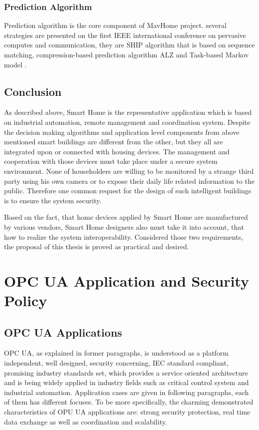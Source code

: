 \subsubsection{Prediction Algorithm}
Prediction algorithm is the core component of MavHome project. several strategies are presented on the first IEEE international conference on pervasive computes and communication, they are SHIP algorithm that is based on sequence matching, compression-based prediction algorithm ALZ and Task-based Markov model \cite{smart_home_agent}.

\subsection{Conclusion}
As described above, Smart Home is the representative application which is based on industrial automation, remote management and coordination system. Despite the decision making algorithms and application level components from above mentioned smart buildings are different from the other, but they all are integrated upon or connected with housing devices. The management and cooperation with those devices must take place under a secure system environment. None of householders are willing to be monitored by a strange third party using his own camera or to expose their daily life related information to the public. Therefore one common request for the design of such intelligent buildings is to ensure the system security.

Based on the fact, that home devices applied by Smart Home are manufactured by various vendors,  Smart Home designers also must take it into account, that how to realize the system interoperability. Considered those two requirements, the proposal of this thesis is proved as practical and desired.

\section{OPC UA Application and Security Policy}

\subsection{OPC UA Applications}
OPC UA, as explained in former paragraphs,  is understood as a platform independent, well designed, security concerning, IEC standard compliant, promising industry standards set, which provides a service oriented architecture and is being widely applied in industry fields such as critical control system and industrial automation. Application cases are given in following paragraphs, each of them has different focuses. To be more specifically, the charming demonstrated characteristics of OPU UA applications are: strong security protection, real time data exchange as well as coordination and scalability. 

